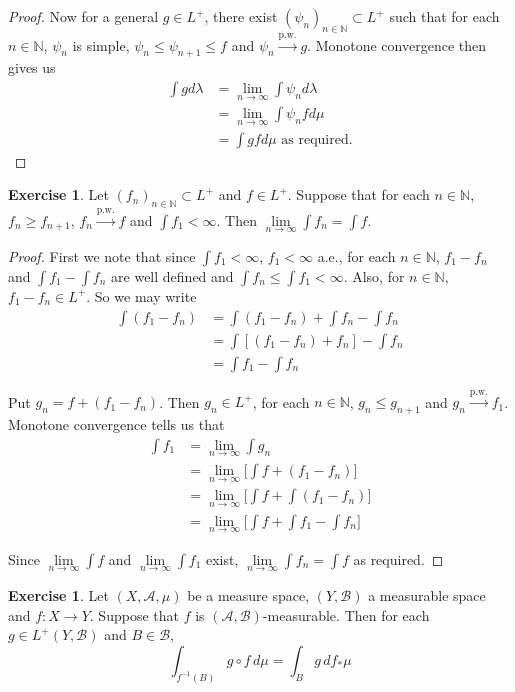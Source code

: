 \documentclass{book}
\theoremstyle{definition}
\newtheorem{ex}[definition]{Exercise}
\newcommand{\lam}{\lambda}
\newcommand{\N}{\mathbb{N}}
\newcommand{\MA}{\mathcal{A}}
\newcommand{\MB}{\mathcal{B}}
\newcommand{\lex}[1]{\label{ex:#1}}
\DeclareMathOperator*{\0}{\mbf{0}}
\DeclareMathOperator*{\1}{\mbf{1}}
\newcommand{\limn}{\lim \limits_{n \rightarrow \infty}}
\newcommand{\dmu}{\, d \mu}
\begin{document}
\begin{proof}
		Now for a general $g \in L^+$, there exist $(\psi_n)_{n \in \N} \subset L^+$ such that for each $n \in \N$, $\psi_n$ is simple, $\psi_n \leq \psi_{n+1} \leq f$ and $\psi_n \xrightarrow{\text{p.w.}} g$. Monotone convergence then gives us 
		\begin{align*}
			\int g d\lam 
			&= \limn \int \psi_n d\lam\\
			&= \limn \int \psi_n f d\mu\\
			&= \int g f d\mu \text{ as required.}
		\end{align*}
	\end{proof}
	
	\begin{ex} \lex{00000} 
		Let $(f_n)_{n \in \N} \subset L^+$ and $f \in L^+$. Suppose that for each $n \in \N$, $f_n \geq f_{n+1}$, $f_n \xrightarrow{\text{p.w.}} f$ and $\int f_1 < \infty$. Then $\limn \int f_n = \int f$.
	\end{ex}
	
	\begin{proof}
		First we note that since $\int f_1 < \infty$, $f_1 < \infty$ a.e., for each $n \in \N$, $f_1 - f_n$ and $\int f_1 - \int f_n$ are well defined and $\int f_n \leq \int f_1 < \infty$. Also, for $n \in \N$, $f_1 -f_n \in L^+$. So we may write 
		\begin{align*}
			\int (f_1 - f_n) 
			&= \int (f_1 - f_n)  + \int f_n - \int f_n\\
			&= \int [(f_1 - f_n) + f_n] - \int f_n\\
			&= \int f_1 - \int f_n
		\end{align*}
		
		Put $g_n = f + (f_1 - f_n)$. Then $g_n \in L^+$, for each $n \in \N$, $g_n \leq g_{n+1}$ and $g_n \xrightarrow{\text{p.w.}} f_1$. Monotone convergence tells us that 
		\begin{align*}
			\int f_1 
			&= \limn \int g_n\\
			&= \limn \bigg[\int f + (f_1-f_n)\bigg]\\
			&= \limn \bigg[ \int f + \int (f_1-f_n)\bigg] \\
			&= \limn \bigg[ \int f + \int f_1- \int f_n\bigg] 
		\end{align*}
		
		Since $\limn \int f$ and $\limn \int f_1$ exist, $\limn \int f_n = \int f$ as required.  
		
	\end{proof}


	\begin{ex}
		Let $(X, \MA, \mu)$ be a measure space, $(Y, \MB)$ a measurable space and $f: X \rightarrow Y$. Suppose that $f$ is $(\MA, \MB)$-measurable. Then for each $g \in L^+(Y, \MB)$ and $B \in \MB$, $$\int_{f^{-1}(B)} g \circ f \dmu = \int_B g \, d f_*\mu$$
	\end{ex}
\end{document}
